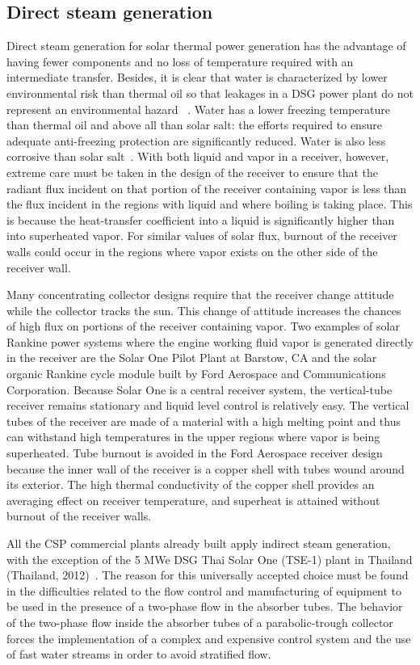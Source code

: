 \subsection{Direct steam generation}
Direct steam generation for solar thermal power generation has the advantage of having fewer components and no loss of temperature required with an intermediate transfer.  Besides, it is clear that water is characterized by lower environmental risk than thermal oil so that leakages in a DSG power plant do not represent an environmental hazard ~\cite{Fernandez2010}. Water has a lower freezing temperature than thermal oil and above all than solar salt: the efforts required to ensure adequate anti-freezing protection are significantly reduced. Water is also less corrosive than solar salt~\cite{Giglio2017}. With both liquid and vapor in a receiver, however, extreme care must be taken in the design of the receiver to ensure that the radiant flux incident on that portion of the receiver containing vapor is less than the flux incident in the regions with liquid and where boiling is taking place. This is because the heat-transfer coefficient into a liquid is significantly higher than into superheated vapor. For similar values of solar flux, burnout of the receiver walls could occur in the regions where vapor exists on the other side of the receiver wall.

Many concentrating collector designs require that the receiver change attitude while the collector tracks the sun. This change of attitude increases the chances of high flux on portions of the receiver containing vapor.
Two examples of solar Rankine power systems where the engine working fluid vapor is generated directly in the receiver are the Solar One Pilot Plant at Barstow, CA and the solar organic Rankine cycle module built by Ford Aerospace and Communications Corporation. Because Solar One is a central receiver system, the vertical-tube receiver remains stationary and liquid level control is relatively easy. The vertical tubes of the receiver are made of a material with a high melting point and thus can withstand high temperatures in the upper regions where vapor is being superheated. Tube burnout is avoided in the Ford Aerospace receiver design because the inner wall of the receiver is a copper shell with tubes wound around its exterior. The high thermal conductivity of the copper shell provides an averaging effect on receiver temperature, and superheat is attained without burnout of the receiver walls.

All the CSP commercial plants already built apply indirect steam generation, with the exception of the 5 MWe DSG Thai Solar One (TSE-1) plant in Thailand (Thailand, 2012)~\cite{Khenissi2015}. The reason for this universally accepted choice must be found in the difficulties related to the flow control and manufacturing of equipment to be used in the presence of a two-phase flow in the absorber tubes. The behavior of the two-phase flow inside the absorber tubes of a parabolic-trough collector forces the implementation of a complex and expensive control system and the use of fast water streams in order to avoid stratified flow.
			
